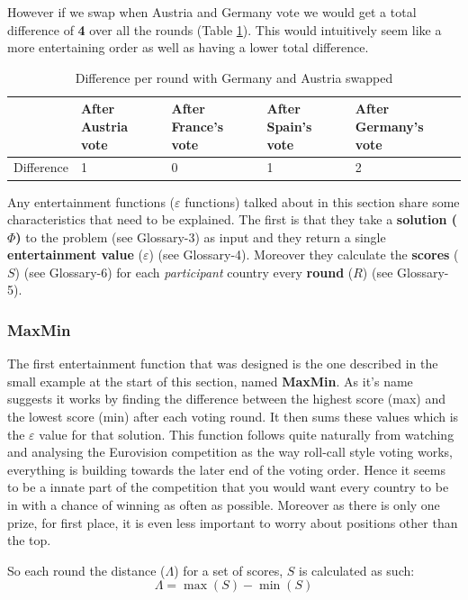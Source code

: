 \documentclass[12pt]{report}
\begin{document}
However if we swap when Austria and Germany vote we would get a total difference of \textbf{4} over all the rounds (Table \ref{t_simpleDifferences2}). This would intuitively seem like a more entertaining order as well as having a lower total difference.

\begin{table}[H]
\centering
\caption{Difference per round with Germany and Austria swapped}
\label{t_simpleDifferences2}
\begin{tabular}{|l|l|l|l|l|}
\hline
        & After Austria vote & After France's vote & After Spain's vote & After Germany's vote \\ \hline
Difference & 1                    & 0                  & 1                   & 2                    \\ \hline
\end{tabular}
\end{table}

Any entertainment functions ($\varepsilon$ functions) talked about in this section share some characteristics that need to be explained. The first is that they take a \textbf{solution ($\Phi$)} to the problem (see Glossary-3) as input and they return a single \textbf{entertainment value} ($\varepsilon$) (see Glossary-4). Moreover they calculate the \textbf{scores} ($S$) (see Glossary-6) for each \textit{participant} country every \textbf{round} ($R$) (see Glossary-5).

\subsubsection{MaxMin}
The first entertainment function that was designed is the one described in the small example at the start of this section, named \textbf{MaxMin}. As it's name suggests it works by finding the difference between the highest score (max) and the lowest score (min) after each voting round. It then sums these values which is the $\varepsilon$ value for that solution. This function follows quite naturally from watching and analysing the Eurovision competition as the way roll-call style voting works, everything is building towards the later end of the voting order. Hence it seems to be a innate part of the competition that you would want every country to be in with a chance of winning as often as possible. Moreover as there is only one prize, for first place, it is even less important to worry about positions other than the top.

So each round the distance ($\Lambda$) for a set of scores, $S$ is calculated as such:
\begin{equation}\label{lambda}
	\Lambda = \max(S) - \min(S)
\end{equation}
\end{document}
